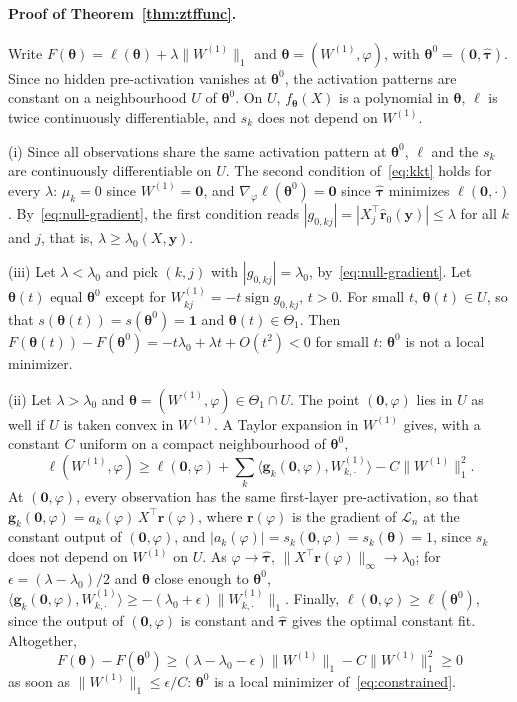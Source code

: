 \documentclass[twoside,11pt]{article}
\newcommand{\bth}{\boldsymbol{\theta}}
\newcommand{\br}{\mathbf{r}}
\newcommand{\by}{\mathbf{y}}
\newcommand{\bone}{\mathbf{1}}
\newcommand{\bzero}{\mathbf{0}}
\newcommand{\Wone}{W^{(1)}}
\newcommand{\PenWone}{\|W^{(1)}\|_1}
\newcommand{\PenWonek}{\|W^{(1)}_{k, \cdot}\|_1}
\newcommand{\Thetaone}{\Theta_{1}}
\begin{document}
\paragraph{Proof of Theorem~\ref{thm:ztffunc}.}
Write $F(\bth)=\ell(\bth)+\lambda\PenWone$ and $\bth=(\Wone,\varphi)$, with $\bth^0=(\bzero,\hat{\boldsymbol\tau})$. Since no hidden pre-activation vanishes at $\bth^0$, the activation patterns are constant on a neighbourhood $U$ of $\bth^0$. On $U$, $f_{\bth}(X)$ is a polynomial in $\bth$, $\ell$ is twice continuously differentiable, and $s_k$ does not depend on $\Wone$.

(i) Since all observations share the same activation pattern at $\bth^0$, $\ell$ and the $s_k$ are continuously differentiable on $U$. The second condition of~\eqref{eq:kkt} holds for every $\lambda$: $\mu_k=0$ since $\Wone=\bzero$, and $\nabla_\varphi\ell(\bth^0)=\bzero$ since $\hat{\boldsymbol\tau}$ minimizes $\ell(\bzero,\cdot)$. By~\eqref{eq:null-gradient}, the first condition reads $|g_{0,kj}|=|X_j^\top\hat{\mathbf r}_0(\by)|\leq\lambda$ for all $k$ and $j$, that is, $\lambda\geq\lambda_0(X,\by)$.

(iii) Let $\lambda<\lambda_0$ and pick $(k,j)$ with $|g_{0,kj}|=\lambda_0$, by~\eqref{eq:null-gradient}. Let $\bth(t)$ equal $\bth^0$ except for $W^{(1)}_{kj}=-t\operatorname{sign}g_{0,kj}$, $t>0$. For small $t$, $\bth(t)\in U$, so that $s(\bth(t))=s(\bth^0)=\bone$ and $\bth(t)\in\Thetaone$. Then $F(\bth(t))-F(\bth^0)=-t\lambda_0+\lambda t+O(t^2)<0$ for small $t$: $\bth^0$ is not a local minimizer.

(ii) Let $\lambda>\lambda_0$ and $\bth=(\Wone,\varphi)\in\Thetaone\cap U$. The point $(\bzero,\varphi)$ lies in $U$ as well if $U$ is taken convex in $\Wone$. A Taylor expansion in $\Wone$ gives, with a constant $C$ uniform on a compact neighbourhood of $\bth^0$,
\begin{equation*}
    \ell(\Wone,\varphi)\geq\ell(\bzero,\varphi)+\sum_k\langle\mathbf g_k(\bzero,\varphi),W^{(1)}_{k,\cdot}\rangle-C\PenWone^2 .
\end{equation*}
At $(\bzero,\varphi)$, every observation has the same first-layer pre-activation, so that $\mathbf g_k(\bzero,\varphi)=a_k(\varphi)\,X^\top\br(\varphi)$, where $\br(\varphi)$ is the gradient of $\mathcal L_n$ at the constant output of $(\bzero,\varphi)$, and $|a_k(\varphi)|=s_k(\bzero,\varphi)=s_k(\bth)=1$, since $s_k$ does not depend on $\Wone$ on $U$. As $\varphi\to\hat{\boldsymbol\tau}$, $\|X^\top\br(\varphi)\|_\infty\to\lambda_0$; for $\epsilon=(\lambda-\lambda_0)/2$ and $\bth$ close enough to $\bth^0$, $\langle\mathbf g_k(\bzero,\varphi),W^{(1)}_{k,\cdot}\rangle\geq-(\lambda_0+\epsilon)\PenWonek$. Finally, $\ell(\bzero,\varphi)\geq\ell(\bth^0)$, since the output of $(\bzero,\varphi)$ is constant and $\hat{\boldsymbol\tau}$ gives the optimal constant fit. Altogether,
\begin{equation*}
    F(\bth)-F(\bth^0)\geq(\lambda-\lambda_0-\epsilon)\PenWone-C\PenWone^2\geq0
\end{equation*}
as soon as $\PenWone\leq\epsilon/C$: $\bth^0$ is a local minimizer of~\eqref{eq:constrained}.
\end{document}
